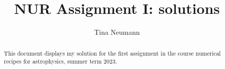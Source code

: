 \documentclass[a4paper,10pt]{article}
\title{NUR Assignment I: solutions}
\author{Tina Neumann}
\begin{document}
\maketitle

\begin{abstract}
This document displays my solution for the first assignment in the course numerical recipes for astrophysics, summer term 2023.
\end{abstract}





%
\end{document}

